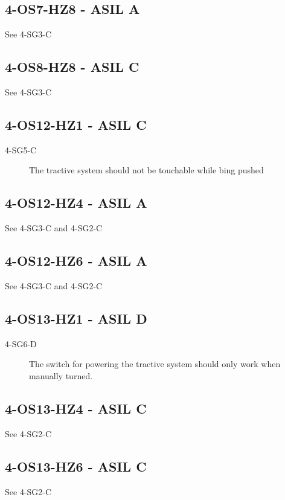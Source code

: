 \subsection{4-OS7-HZ8 - ASIL A}
See 4-SG3-C
\subsection{4-OS8-HZ8 - ASIL C}
See 4-SG3-C 



\subsection{4-OS12-HZ1 - ASIL C}
\begin{description}
\item [4-SG5-C] The tractive system should not be touchable while bing pushed
\end{description}
\subsection{4-OS12-HZ4 - ASIL A}
See 4-SG3-C and 4-SG2-C 
\subsection{4-OS12-HZ6 - ASIL A}
See 4-SG3-C and 4-SG2-C 
\subsection{4-OS13-HZ1 - ASIL D}
\begin{description}
\item [4-SG6-D] The switch for powering the tractive system should only work when manually turned.
\end{description}
\subsection{4-OS13-HZ4 - ASIL C}
See 4-SG2-C 
\subsection{4-OS13-HZ6 - ASIL C}
See 4-SG2-C 


